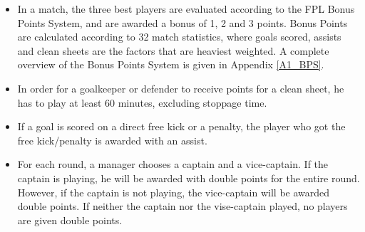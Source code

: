 \begin{itemize}
    \item In a match, the three best players are evaluated according to the FPL Bonus Points System, and are awarded a bonus of 1, 2 and 3 points. Bonus Points are calculated according to 32 match statistics, where goals scored, assists and clean sheets are the factors that are heaviest weighted. A complete overview of the Bonus Points System is given in Appendix \ref{A1_BPS}.
    \item In order for a goalkeeper or defender to receive points for a clean sheet, he has to play at least 60 minutes, excluding stoppage time. 
    \item If a goal is scored on a direct free kick or a penalty, the player who got the free kick/penalty is awarded with an assist. 
    \item For each round, a manager chooses a captain and a vice-captain. If the captain is playing, he will be awarded with double points for the entire round. However, if the captain is not playing, the vice-captain will be awarded double points. If neither the captain nor the vise-captain played, no players are given double points.
\end{itemize}


